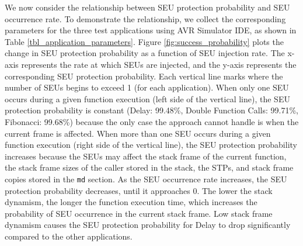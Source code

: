 We now consider the relationship between SEU protection probability and SEU occurrence rate. To demonstrate the relationship, we collect the corresponding parameters for the three test applications using AVR Simulator IDE, as shown in Table \ref{tbl_application_parameters}. Figure \ref{fig:success_probability} plots the change in SEU protection probability as a function of SEU injection rate. The x-axis represents the rate at which SEUs are injected, and the y-axis represents the corresponding SEU protection probability. Each vertical line marks where the number of SEUs begins to exceed 1 (for each application). When only one SEU occurs during a given function execution (left side of the vertical line), the SEU protection probability is constant (Delay: 99.48\%, Double Function Calls: 99.71\%, Fibonacci: 99.68\%) because the only case the approach cannot handle is when the current frame is affected. When more than one SEU occurs during a given function execution (right side of the vertical line), the SEU protection probability increases because the SEUs may affect the stack frame of the current function, the stack frame sizes of the caller stored in the stack, the STPs, and stack frame copies stored in the \texttt{md} section. As the SEU occurrence rate increases, the SEU protection probability decreases, until it approaches 0. The lower the stack dynamism, the longer the function execution time, which increases the probability of SEU occurrence in the current stack frame. Low stack frame dynamism causes the SEU protection probability for Delay to drop significantly compared to the other applications.
\vspace{-15pt}
